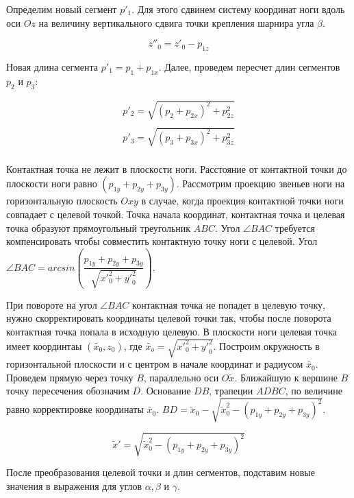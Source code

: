 Определим новый сегмент $p'_1$. Для этого сдвинем систему координат ноги вдоль оси $Oz$ на величину вертикального сдвига точки крепления шарнира угла $\beta$.

\begin{equation}
z''_0 =z'_0-p_{1z} 
\end{equation}

Новая длина сегмента $p'_1 = p_1+p_{1x}$. Далее, проведем пересчет длин сегментов $p_2$ и $p_3$:

\begin{equation}
\begin{array}{lcr}
p'_2 = \sqrt{(p_2+p_{2x})^2+p_{2z}^2}\\
\\
p'_3 = \sqrt{(p_3+p_{3x})^2+p_{3z}^2}\\
\end{array}
\end{equation}

Контактная точка не лежит в плоскости ноги. Расстояние от контактной точки до плоскости ноги равно $(p_{1y}+p_{2y}+p_{3y})$. Рассмотрим проекцию звеньев ноги на горизонтальную плоскость $Oxy$ в случае, когда проекция контактной точки ноги совпадает с целевой точкой. Точка начала координат, контактная точка и целевая точка образуют прямоугольный треугольник $ABC$. Угол $\angle BAC$ требуется компенсировать чтобы совместить контактную точку ноги с целевой. Угол $\angle BAC = arcsin\left(\dfrac{p_{1y}+p_{2y}+p_{3y}}{\sqrt{{x'}_0^2+{y'}_0^2}}\right)$.

При повороте на угол $\angle BAC$ контактная точка не попадет в целевую точку, нужно скорректировать координаты целевой точки так, чтобы после поворота контактная точка попала в исходную целевую.
В плоскости ноги целевая точка имеет координтаы $(\tilde{x_0}, z_0)$, где $\tilde{x_o} = \sqrt{{x'}_0^2+{y'}_0^2}$. 
Построим окружность в горизонтальной плоскости и с центром в начале координат и радиусом $\tilde{x_0}$. Проведем прямую через точку $B$, параллельно оси $O\tilde{x}$. Ближайшую к вершине $B$ точку пересечения обозначим $D$. Основание $DB$, трапеции $ADBC$, по величине равно корректировке координаты $\tilde{x_0}$. $BD = \tilde{x}_0-\sqrt{\tilde{x}_0^2-(p_{1y}+p_{2y}+p_{3y})^2}$.

\begin{equation}
\tilde{x}' = \sqrt{\tilde{x}_0^2-(p_{1y}+p_{2y}+p_{3y})^2}
\end{equation}

После преобразования целевой точки и длин сегментов, подставим новые значения в выражения для углов $\alpha, \beta$ и $\gamma$.


